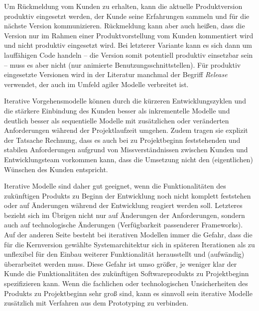Um  Rückmeldung vom Kunden zu erhalten, kann die aktuelle Produktversion produktiv eingesetzt werden, der Kunde seine Erfahrungen sammeln und für die nächste Version kommunizieren. Rückmeldung kann aber auch heißen, dass die Version nur im Rahmen einer Produktvorstellung vom Kunden kommentiert wird und nicht produktiv eingesetzt wird. Bei letzterer Variante kann es sich dann um lauffähigen Code handeln – die Version somit potentiell produktiv einsetzbar sein – muss es aber nicht (\zb nur animierte Benutzungsschnittstellen). Für produktiv eingesetzte Versionen wird in der Literatur manchmal der Begriff \textit{Release}
verwendet, der auch im Umfeld agiler Modelle verbreitet ist.

\pagebreak %

 
Iterative Vorgehensmodelle können durch die kürzeren Entwicklungszyklen und die stärkere Einbindung des Kunden besser als inkrementelle Modelle und deutlich besser als sequentielle Modelle mit zusätzlichen oder veränderten Anforderungen während der Projektlaufzeit umgehen. Zudem tragen sie explizit der Tatsache Rechnung, dass es auch bei zu Projektbeginn feststehenden und stabilen Anforderungen aufgrund von Missverständnissen zwischen Kunden und Entwicklungsteam vorkommen kann, dass die Umsetzung nicht den (eigentlichen) Wünschen des Kunden entspricht. 

Iterative  Modelle sind daher gut geeignet, wenn die Funktionalitäten des zukünftigen Produkts zu Beginn der Entwicklung noch nicht komplett feststehen oder auf Änderungen während der Entwicklung reagiert werden soll. Letzteres bezieht sich im Übrigen nicht nur auf Änderungen der Anforderungen, sondern auch auf technologische Änderungen (\zb Verfügbarkeit passenderer Frameworks). Auf der anderen Seite besteht bei iterativen Modellen immer die Gefahr, dass die für die Kernversion gewählte Systemarchitektur sich in späteren Iterationen als zu unflexibel für den Einbau weiterer Funktionalität herausstellt und (aufwändig) überarbeitet werden muss. Diese Gefahr ist umso größer, je weniger klar der Kunde die Funktionalitäten des zukünftigen Softwareprodukts zu Projektbeginn spezifizieren kann. Wenn die fachlichen oder technologischen Unsicherheiten des Produkts zu Projektbeginn sehr groß sind, kann es sinnvoll sein iterative Modelle zusätzlich mit Verfahren aus dem Prototyping 
zu verbinden. 

